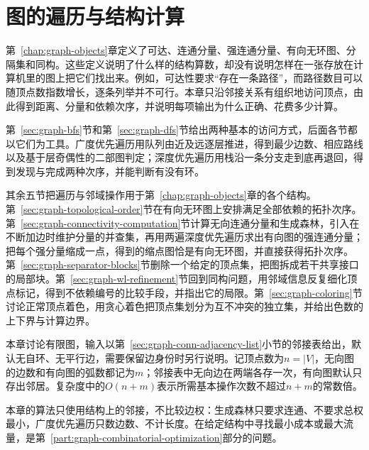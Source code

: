 \chapter{图的遍历与结构计算}
\label{chap:graph-traversal}

第~\ref{chap:graph-objects}章定义了可达、连通分量、强连通分量、有向无环图、分隔集和同构。这些定义说明了什么样的结构算数，却没有说明怎样在一张存放在计算机里的图上把它们找出来。例如，可达性要求“存在一条路径”，而路径数目可以随顶点数指数增长，逐条列举并不可行。本章只沿邻接关系有组织地访问顶点，由此得到距离、分量和依赖次序，并说明每项输出为什么正确、花费多少计算。

第~\ref{sec:graph-bfs}节和第~\ref{sec:graph-dfs}节给出两种基本的访问方式，后面各节都以它们为工具。广度优先遍历用队列由近及远逐层推进，得到最少边数、相应路线以及基于层奇偶性的二部图判定；深度优先遍历用栈沿一条分支走到底再退回，得到发现与完成两种次序，并能判断有没有环。

其余五节把遍历与邻域操作用于第~\ref{chap:graph-objects}章的各个结构。第~\ref{sec:graph-topological-order}节在有向无环图上安排满足全部依赖的拓扑次序。第~\ref{sec:graph-connectivity-computation}节计算无向连通分量和生成森林，引入在不断加边时维护分量的并查集，再用两遍深度优先遍历求出有向图的强连通分量；把每个强分量缩成一点，得到的缩点图恰是有向无环图，并直接获得拓扑次序。第~\ref{sec:graph-separator-blocks}节删除一个给定的顶点集，把图拆成若干共享接口的局部块。第~\ref{sec:graph-wl-refinement}节回到同构问题，用邻域信息反复细化顶点标记，得到不依赖编号的比较手段，并指出它的局限。第~\ref{sec:graph-coloring}节讨论正常顶点着色，用贪心着色把顶点集划分为互不冲突的独立集，并给出色数的上下界与计算边界。

本章讨论有限图，输入以第~\ref{sec:graph-conn-adjacency-list}小节的邻接表给出，默认无自环、无平行边，需要保留边身份时另行说明。记顶点数为$n=|V|$，无向图的边数和有向图的弧数都记为$m$；邻接表中无向边在两端各存一次，有向图默认只存出邻居。复杂度中的$O(n+m)$表示所需基本操作次数不超过$n+m$的常数倍。

本章的算法只使用结构上的邻接，不比较边权：生成森林只要求连通、不要求总权最小，广度优先遍历只数边数、不计长度。在给定结构中寻找最小成本或最大流量，是第~\ref{part:graph-combinatorial-optimization}部分的问题。









